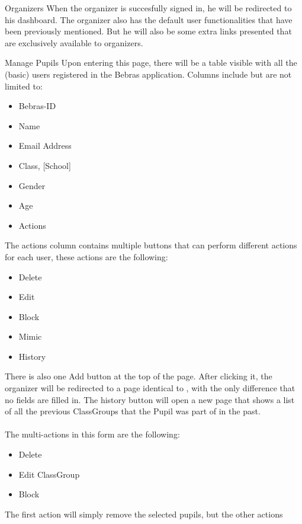 \begin{section}{Organizers}
	\label{sec:organizer}
	When the organizer is succesfully signed in, he will be redirected to his dashboard.
	The organizer also has the default user functionalities that have been previously
	mentioned. But he will also be some extra links presented that are exclusively
	available to organizers.
	
	\begin{subsection}{Manage Pupils}
		\label{sec:organizer_manage_pupils}
		Upon entering this page, there will be a table visible with all the (basic) users
		registered in the Bebras application. Columns include but are not limited to:
		\begin{itemize}
			\item Bebras-ID
			\item Name
			\item Email Address
			\item Class, [School]
			\item Gender
			\item Age
			\item Actions
		\end{itemize}
		The actions column contains multiple buttons that can perform different actions
		for each user, these actions are the following:
		\begin{itemize}
			\item Delete
			\item Edit
			\item Block
			\item Mimic
			\item History
		\end{itemize}
		There is also one Add button at the top of the page. After clicking it, the
		organizer will be redirected to a page identical to
		, with the only difference that no fields
		are filled in. The history button will open a new page that shows a list of all
		the previous ClassGroups that the Pupil was part of in the past. \\
		\\
		The multi-actions in this form are the following:
		\begin{itemize}
			\item Delete
			\item Edit ClassGroup
			\item Block
		\end{itemize}
		The first action will simply remove the selected pupils, but the other actions

\end{subsection}
\end{section}
